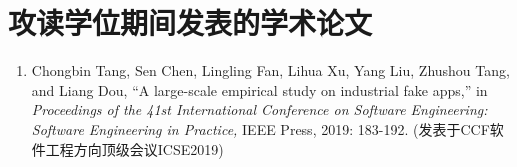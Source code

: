 



\chapter*{攻读学位期间发表的学术论文}






\begin{enumerate}
	
	\item Chongbin Tang, Sen Chen, Lingling Fan, Lihua Xu, Yang Liu, Zhushou Tang, and Liang Dou, ``A large-scale empirical study on industrial fake apps,'' in \textit{Proceedings of the 41st International Conference on Software Engineering: Software Engineering in Practice,} IEEE Press, 2019: 183-192. (发表于CCF软件工程方向顶级会议ICSE2019)
	
\end{enumerate}


